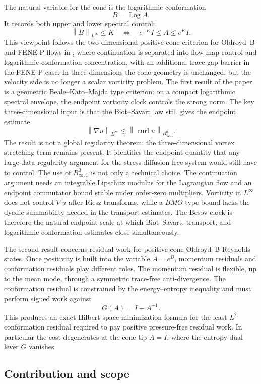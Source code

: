 \documentclass[10pt,a4paper]{amsart}
\numberwithin{equation}{section}
\newcommand{\Id}{I}
\newcommand{\curl}{\operatorname{curl}}
\newcommand{\Log}{\operatorname{Log}}
\newcommand{\norm}[1]{\left\lVert #1\right\rVert}
\begin{document}
The natural variable for the cone is the logarithmic conformation
\[
  B=\Log A .
\]
It records both upper and lower spectral control:
\[
  \norm{B}_{L^\infty}\le K
  \quad\Longleftrightarrow\quad
  e^{-K}\Id\le A\le e^K\Id .
\]
This viewpoint follows the two-dimensional positive-cone criterion for
Oldroyd--B and FENE-P flows in \cite{PengUnified}, where continuation is
separated into flow-map control and logarithmic conformation concentration,
with an additional trace-gap barrier in the FENE-P case.  In three dimensions
the cone geometry is unchanged, but the velocity side is no longer a scalar
vorticity problem.  The first result of the paper is a geometric
Beale--Kato--Majda type criterion: on a compact logarithmic spectral envelope,
the endpoint vorticity clock controls the strong norm.  The key
three-dimensional input is that the Biot--Savart law still gives the endpoint
estimate
\[
  \norm{\nabla u}_{L^\infty}\lesssim
  \norm{\curl u}_{B^0_{\infty,1}} .
\]
The result is not a global regularity theorem: the three-dimensional vortex
stretching term remains present.  It identifies the endpoint quantity that any
large-data regularity argument for the stress-diffusion-free system would still
have to control.  The use of \(B^0_{\infty,1}\) is not only a technical choice.
The continuation argument needs an integrable Lipschitz modulus for
the Lagrangian flow and an endpoint commutator bound stable under order-zero
multipliers.  Vorticity in \(L^\infty\) does not control \(\nabla u\) after
Riesz transforms, while a \(BMO\)-type bound lacks the dyadic summability needed
in the transport estimates.  The Besov clock is therefore the natural endpoint
scale at which Biot--Savart, transport, and logarithmic conformation estimates
close simultaneously.

The second result concerns residual work for positive-cone Oldroyd--B Reynolds
states.  Once positivity is built into the variable \(A=e^B\), momentum
residuals and conformation residuals play different roles.  The momentum
residual is flexible, up to the mean mode, through a symmetric trace-free
anti-divergence.  The conformation residual is constrained by the
energy--entropy inequality and must perform signed work against
\[
  G(A)=\Id-A^{-1}.
\]
This produces an exact Hilbert-space minimization formula for the least
\(L^2\) conformation residual required to pay positive pressure-free residual
work.  In particular the cost degenerates at the cone tip \(A=\Id\), where the
entropy-dual lever \(G\) vanishes.

\subsection*{Contribution and scope}
\end{document}
